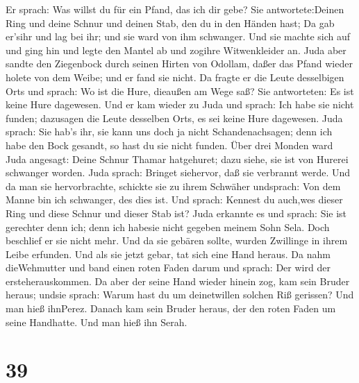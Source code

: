  Er sprach: Was willst du für ein Pfand, das ich dir gebe?
Sie antwortete:Deinen Ring und deine Schnur und deinen Stab, den du in
den Händen hast; Da gab er'sihr und lag bei ihr; und sie ward von ihm
schwanger.  Und sie machte sich auf und ging hin und legte
den Mantel ab und zogihre Witwenkleider an.  Juda aber
sandte den Ziegenbock durch seinen Hirten von Odollam, daßer das Pfand
wieder holete von dem Weibe; und er fand sie nicht.  Da
fragte er die Leute desselbigen Orts und sprach: Wo ist die Hure,
dieaußen am Wege saß? Sie antworteten: Es ist keine Hure dagewesen.
 Und er kam wieder zu Juda und sprach: Ich habe sie nicht
funden; dazusagen die Leute desselben Orts, es sei keine Hure dagewesen.
 Juda sprach: Sie hab's ihr, sie kann uns doch ja nicht
Schandenachsagen; denn ich habe den Bock gesandt, so hast du sie nicht
funden.  Über drei Monden ward Juda angesagt: Deine Schnur
Thamar hatgehuret; dazu siehe, sie ist von Hurerei schwanger worden.
Juda sprach: Bringet siehervor, daß sie verbrannt werde. 
Und da man sie hervorbrachte, schickte sie zu ihrem Schwäher undsprach:
Von dem Manne bin ich schwanger, des dies ist. Und sprach: Kennest du
auch,wes dieser Ring und diese Schnur und dieser Stab ist? 
Juda erkannte es und sprach: Sie ist gerechter denn ich; denn ich
habesie nicht gegeben meinem Sohn Sela. Doch beschlief er sie nicht
mehr.  Und da sie gebären sollte, wurden Zwillinge in ihrem
Leibe erfunden.  Und als sie jetzt gebar, tat sich eine
Hand heraus. Da nahm dieWehmutter und band einen roten Faden darum und
sprach: Der wird der ersteherauskommen.  Da aber der seine
Hand wieder hinein zog, kam sein Bruder heraus; undsie sprach: Warum
hast du um deinetwillen solchen Riß gerissen? Und man hieß ihnPerez.
 Danach kam sein Bruder heraus, der den roten Faden um
seine Handhatte. Und man hieß ihn Serah.

\hypertarget{section-38}{%
\section{39}\label{section-38}}

